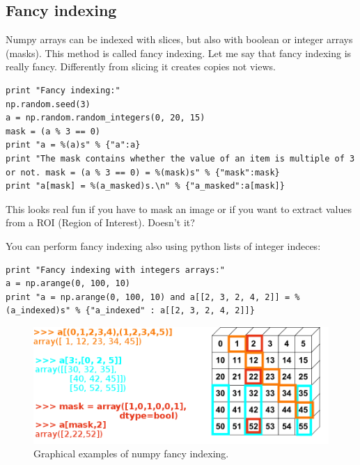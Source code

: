 \documentclass[aps,letterpaper,10pt]{revtex4}
\begin{document}
\subsection{Fancy indexing}
Numpy arrays can be indexed with slices, but also with boolean or integer arrays (masks). This method is called fancy indexing. Let me say that fancy indexing is really fancy. Differently from slicing it creates copies not views.
\begin{lstlisting}
print "Fancy indexing:"
np.random.seed(3)
a = np.random.random_integers(0, 20, 15)
mask = (a % 3 == 0)
print "a = %(a)s" % {"a":a}
print "The mask contains whether the value of an item is multiple of 3 or not. mask = (a % 3 == 0) = %(mask)s" % {"mask":mask}
print "a[mask] = %(a_masked)s.\n" % {"a_masked":a[mask]}
\end{lstlisting}
This looks real fun if you have to mask an image or if you want to extract values from a ROI (Region of Interest). Doesn't it?

You can perform fancy indexing also using python lists of integer indeces:
\begin{lstlisting}
print "Fancy indexing with integers arrays:"
a = np.arange(0, 100, 10)
print "a = np.arange(0, 100, 10) and a[[2, 3, 2, 4, 2]] = %(a_indexed)s" % {"a_indexed" : a[[2, 3, 2, 4, 2]]}
\end{lstlisting}
\begin{figure}[h]
\includegraphics[scale=0.4]{img/numpy_fancy_indexing.png}
\centering
\caption{Graphical examples of numpy fancy indexing.}\label{fig:5}
\end{figure}
\end{document}
